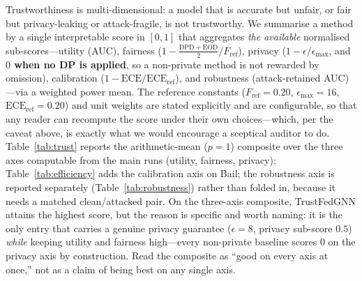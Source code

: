 \documentclass[pdflatex,sn-mathphys-num]{sn-jnl}
\theoremstyle{thmstyleone}%
\theoremstyle{thmstyletwo}%
\theoremstyle{thmstylethree}%
\newcommand{\dpd}{\mathrm{DPD}}
\newcommand{\eod}{\mathrm{EOD}}
\begin{document}
Trustworthiness is multi-dimensional: a model that is accurate but unfair, or
fair but privacy-leaking or attack-fragile, is not trustworthy. We summarise a
method by a single interpretable score in $[0,1]$ that aggregates \emph{the
available} normalised sub-scores---utility (AUC), fairness
($1-\tfrac{\dpd+\eod}{2}/F_{\text{ref}}$), privacy ($1-\epsilon/\epsilon_{\max}$,
and \textbf{$0$ when no DP is applied}, so a non-private method is not rewarded
by omission), calibration ($1-\mathrm{ECE}/\mathrm{ECE}_{\text{ref}}$), and
robustness (attack-retained AUC)---via a weighted power mean. The reference
constants ($F_{\text{ref}}{=}0.20$, $\epsilon_{\max}{=}16$,
$\mathrm{ECE}_{\text{ref}}{=}0.20$) and unit weights are stated explicitly and
are configurable, so that any reader can recompute the score under their own
choices---which, per the caveat above, is exactly what we would encourage a
sceptical auditor to do. Table~\ref{tab:trust} reports the arithmetic-mean ($p{=}1$)
composite over the three axes computable from the main runs (utility, fairness,
privacy); Table~\ref{tab:efficiency} adds the calibration axis on Bail; the
robustness axis is reported separately (Table~\ref{tab:robustness}) rather than
folded in, because it needs a matched clean/attacked pair. On the three-axis
composite, TrustFedGNN attains the highest score, but the reason is specific and
worth naming: it is the only entry that carries a genuine privacy guarantee
($\epsilon{=}8$, privacy sub-score $0.5$) \emph{while} keeping utility and
fairness high---every non-private baseline scores $0$ on the privacy axis by
construction. Read the composite as ``good on every axis at once,'' not as a
claim of being best on any single axis.

\begin{table}[t]\centering\small
\caption{Composite trust score on Bail: utility, fairness, and privacy combined
via the arithmetic-mean ($p{=}1$) power mean, from the same canonical runs as
Tables~\ref{tab:main-auc}--\ref{tab:main-eod}. Non-private methods score $0$ on
privacy by construction. The calibration-augmented composite is in
Table~\ref{tab:efficiency}. Ranking is sensitive to the reference constants
(stated in text); best in bold.}
\label{tab:trust}

\end{table}
\end{document}
